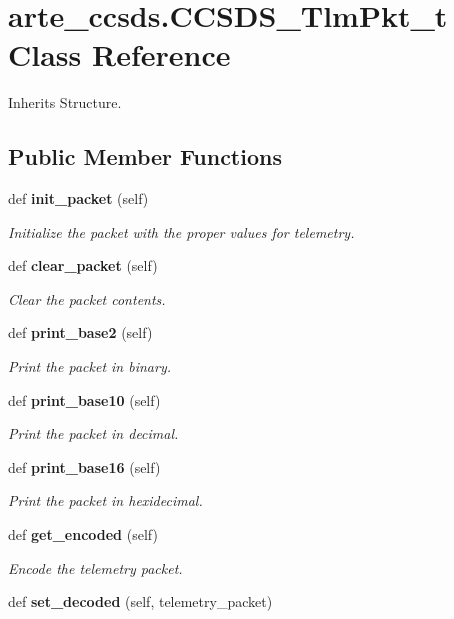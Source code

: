 \section{arte\+\_\+ccsds.\+C\+C\+S\+D\+S\+\_\+\+Tlm\+Pkt\+\_\+t Class Reference}
\label{classarte__ccsds_1_1_c_c_s_d_s___tlm_pkt__t}


Inherits Structure.

\subsection*{Public Member Functions}
\begin{DoxyCompactItemize}
\item 
def {\bf init\+\_\+packet} (self)
\begin{DoxyCompactList}\small\item\em Initialize the packet with the proper values for telemetry. \end{DoxyCompactList}\item 
def {\bf clear\+\_\+packet} (self)
\begin{DoxyCompactList}\small\item\em Clear the packet contents. \end{DoxyCompactList}\item 
def {\bf print\+\_\+base2} (self)
\begin{DoxyCompactList}\small\item\em Print the packet in binary. \end{DoxyCompactList}\item 
def {\bf print\+\_\+base10} (self)
\begin{DoxyCompactList}\small\item\em Print the packet in decimal. \end{DoxyCompactList}\item 
def {\bf print\+\_\+base16} (self)
\begin{DoxyCompactList}\small\item\em Print the packet in hexidecimal. \end{DoxyCompactList}\item 
def {\bf get\+\_\+encoded} (self)
\begin{DoxyCompactList}\small\item\em Encode the telemetry packet. \end{DoxyCompactList}\item 
def {\bf set\+\_\+decoded} (self, telemetry\+\_\+packet)

\end{DoxyCompactItemize}
